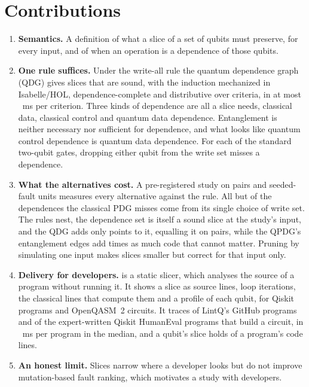 \documentclass[10pt]{article}
\begin{document}
\section*{Contributions}
\begin{enumerate}
\item \textbf{Semantics.} A definition of what a slice of a set of qubits must preserve, for every input, and
of when an operation is a dependence of those qubits.
\item \textbf{One rule suffices.} Under the write-all rule the quantum dependence graph (QDG) gives slices
that are sound, with the induction mechanized in Isabelle/HOL, dependence-complete and distributive over
criteria, in at most \numCostLcMaxCritMs{}~ms per criterion. Three kinds of dependence are all a slice needs,
classical data, classical control and quantum data dependence. Entanglement is neither necessary nor
sufficient for dependence, and what looks like quantum control dependence is quantum data dependence. For
each of the \numGateSignalN{} standard two-qubit gates, dropping either qubit from the write set misses a
dependence.
\item \textbf{What the alternatives cost.} A pre-registered study on \numNPairs{} pairs and
\numRqThreeUnits{} seeded-fault units measures every alternative against the rule. All but
\numCpdgMissFeedback{} of the \numCpdgMissTotal{} dependences the classical PDG misses come from its single
choice of write set. The rules nest, the dependence set is itself a sound slice at the study's input, and the QDG adds only
\numLcExcess{} points to it, equalling it on \numNestDEqQdg{} pairs, while the QPDG's entanglement edges add
\numYzLcExcessRatio{} times as much code that cannot matter. Pruning by simulating one input makes slices
\numHTwoRelative{} smaller but correct for that input only.
\item \textbf{Delivery for developers.} \tool{} is a static slicer, which analyses the source of a program without
running it. %
It shows a slice as source lines, loop iterations, the classical lines that compute them and a
profile of each qubit, for Qiskit programs and OpenQASM~2 circuits. It traces \numScaleSOneSliced{} of
LintQ's \numScaleSOneFiles{} GitHub programs and \numQheTracedOfBuildsPct{} of the expert-written Qiskit
HumanEval programs that build a circuit, in \numScaleSOneMedianMs{}~ms per program in the median, and a
qubit's slice holds \numScaleReadMedianPct{} of a program's code lines.
\item \textbf{An honest limit.} Slices narrow where a developer looks but do not improve mutation-based fault
ranking, which motivates a study with developers.
\end{enumerate}
\end{document}
